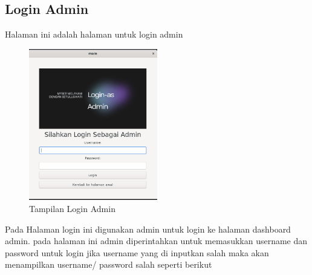 \documentclass[a4paper,12pt]{article}
\begin{document}
\subsection{Login Admin}
Halaman ini adalah halaman untuk login admin 
\begin{figure}[!htbp]
    \centering
    \includegraphics[width=0.5\textwidth]{./img/login_admin/tapilan_login.png}
    \caption{Tampilan Login Admin}
\end{figure}
\FloatBarrier
Pada Halaman login ini digunakan admin untuk login ke halaman dashboard admin. pada halaman ini 
admin diperintahkan untuk memasukkan username dan password untuk login jika username yang di inputkan salah maka akan menampilkan username/ password salah seperti berikut
\end{document}
